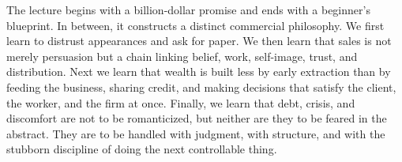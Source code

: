 The lecture begins with a billion-dollar promise and ends with a beginner's blueprint. In between, it constructs a distinct commercial philosophy. We first learn to distrust appearances and ask for paper. We then learn that sales is not merely persuasion but a chain linking belief, work, self-image, trust, and distribution. Next we learn that wealth is built less by early extraction than by feeding the business, sharing credit, and making decisions that satisfy the client, the worker, and the firm at once. Finally, we learn that debt, crisis, and discomfort are not to be romanticized, but neither are they to be feared in the abstract. They are to be handled with judgment, with structure, and with the stubborn discipline of doing the next controllable thing.